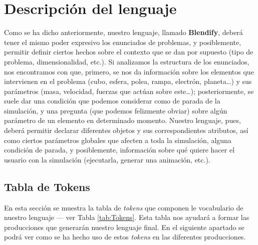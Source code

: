 \documentclass[12pt]{article}
\begin{document}
\section{Descripción del lenguaje}

Como se ha dicho anteriormente, nuestro lenguaje, llamado \textbf{Blendify}, deberá tener el mismo poder expresivo los enunciados de problemas, y posiblemente, permitir definir ciertos hechos sobre el contexto que se dan por supuesto (tipo de problema, dimensionalidad, etc.). Si analizamos la estructura de los enunciados, nos encontramos con que, primero, se nos da información sobre los elementos que intervienen en el problema (cubo, esfera, polea, rampa, electrón, planeta…) y sus parámetros (masa, velocidad, fuerzas que actúan sobre este…); posteriormente, se suele dar una condición que podemos considerar como de parada de la simulación, y una pregunta (que podemos felizmente obviar) sobre algún parámetro de un elemento en determinado momento. Nuestro lenguaje, pues, deberá permitir declarar diferentes objetos y sus correspondientes atributos, así como ciertos parámetros globales que afecten a toda la simulación, alguna condición de parada, y posiblemente, información sobre qué quiere hacer el usuario con la simulación (ejecutarla, generar una animación, etc.).

\subsection{Tabla de Tokens}

En esta sección se muestra la tabla de \textit{tokens} que componen le vocabulario de nuestro lenguaje ---  ver Tabla \ref{tab:Tokens}. Esta tabla nos ayudará a formar las producciones que generarán nuestro lenguaje final. En el siguiente apartado se podrá ver como se ha hecho uso de estos \textit{tokens} en las diferentes producciones.
\end{document}
